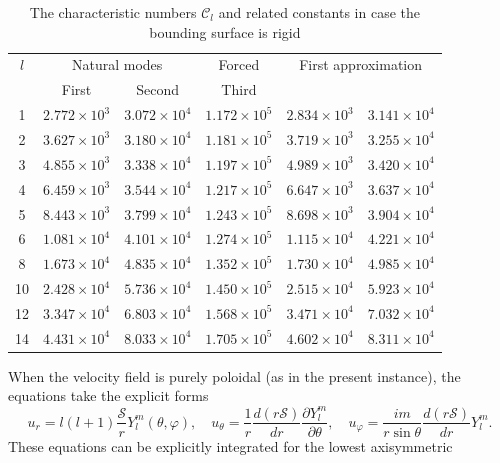 \begin{table}[ht]
\centering
\caption{The characteristic numbers $\mathcal{C}_l$ and related constants in case the bounding surface is rigid}
\label{tab:XXI}
\begin{tabular}{c c c c c c}
\hline
$l$ & \multicolumn{2}{c}{Natural modes} & Forced & \multicolumn{2}{c}{First approximation} \\
 & First & Second & Third & & \\
\hline
1 & $2.772\times 10^3$ & $3.072\times 10^4$ & $1.172\times 10^5$ & $2.834\times 10^3$ & $3.141\times 10^4$ \\
2 & $3.627\times 10^3$ & $3.180\times 10^4$ & $1.181\times 10^5$ & $3.719\times 10^3$ & $3.255\times 10^4$ \\
3 & $4.855\times 10^3$ & $3.338\times 10^4$ & $1.197\times 10^5$ & $4.989\times 10^3$ & $3.420\times 10^4$ \\
4 & $6.459\times 10^3$ & $3.544\times 10^4$ & $1.217\times 10^5$ & $6.647\times 10^3$ & $3.637\times 10^4$ \\
5 & $8.443\times 10^3$ & $3.799\times 10^4$ & $1.243\times 10^5$ & $8.698\times 10^3$ & $3.904\times 10^4$ \\
6 & $1.081\times 10^4$ & $4.101\times 10^4$ & $1.274\times 10^5$ & $1.115\times 10^4$ & $4.221\times 10^4$ \\
8 & $1.673\times 10^4$ & $4.835\times 10^4$ & $1.352\times 10^5$ & $1.730\times 10^4$ & $4.985\times 10^4$ \\
10 & $2.428\times 10^4$ & $5.736\times 10^4$ & $1.450\times 10^5$ & $2.515\times 10^4$ & $5.923\times 10^4$ \\
12 & $3.347\times 10^4$ & $6.803\times 10^4$ & $1.568\times 10^5$ & $3.471\times 10^4$ & $7.032\times 10^4$ \\
14 & $4.431\times 10^4$ & $8.033\times 10^4$ & $1.705\times 10^5$ & $4.602\times 10^4$ & $8.311\times 10^4$ \\
\hline
\end{tabular}
\end{table}


When the velocity field is purely poloidal (as in the present instance),
the equations take the explicit forms
\begin{equation}\label{eq:6-123}
u_r = l(l+1)\frac{\mathscr{S}}{r}Y_l^m(\theta,\varphi),\quad u_\theta = \frac{1}{r}\frac{d(r\mathscr{S})}{dr}\frac{\partial Y_l^m}{\partial\theta},\quad u_\varphi = \frac{im}{r\sin\theta}\frac{d(r\mathscr{S})}{dr}Y_l^m.
\end{equation}
These equations can be explicitly integrated for the lowest axisymmetric

